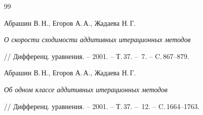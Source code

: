 \begin{thebibliography}{99}


Абрашин В.\,Н., Егоров А.\,А., Жадаева Н.\,Г.


{\it О скорости сходимости аддитивных итерационных методов}


// Дифференц. уравнения. -- 2001. -- Т.\,37. -- \No\,7. -- C.\,867--879.




Абрашин В.\,Н., Егоров А.\,А., Жадаева Н.\,Г.


{\it Об одном классе аддитивных итерационных методов}


// Дифференц. уравнения. -- 2001. -- Т.\,37. -- \No\,12. -- C.\,1664--1763.





\end{thebibliography}





\vskip 1cm









\smallskip







\label{end}





